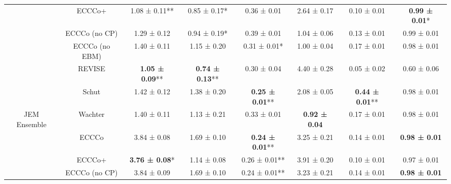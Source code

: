 \begin{table}
{\begin{tabular}[t]{cccccccc}
 & ECCCo+ & 1.08 ± 0.11** & 0.85 ± 0.17*\hphantom{*} & 0.36 ± 0.01\hphantom{*}\hphantom{*} & 2.64 ± 0.17\hphantom{*}\hphantom{*} & 0.10 ± 0.01\hphantom{*}\hphantom{*} & \textbf{0.99 ± 0.01}*\hphantom{*}\\

 & ECCCo (no CP) & 1.29 ± 0.12\hphantom{*}\hphantom{*} & 0.94 ± 0.19*\hphantom{*} & 0.39 ± 0.01\hphantom{*}\hphantom{*} & 1.04 ± 0.06\hphantom{*}\hphantom{*} & 0.13 ± 0.01\hphantom{*}\hphantom{*} & 0.99 ± 0.01\hphantom{*}\hphantom{*}\\

 & ECCCo (no EBM) & 1.40 ± 0.11\hphantom{*}\hphantom{*} & 1.15 ± 0.20\hphantom{*}\hphantom{*} & 0.31 ± 0.01*\hphantom{*} & 1.00 ± 0.04\hphantom{*}\hphantom{*} & 0.17 ± 0.01\hphantom{*}\hphantom{*} & 0.98 ± 0.01\hphantom{*}\hphantom{*}\\

 & REVISE & \textbf{1.05 ± 0.09}** & \textbf{0.74 ± 0.13}** & 0.30 ± 0.04\hphantom{*}\hphantom{*} & 4.40 ± 0.28\hphantom{*}\hphantom{*} & 0.05 ± 0.02\hphantom{*}\hphantom{*} & 0.60 ± 0.06\hphantom{*}\hphantom{*}\\

 & Schut & 1.42 ± 0.12\hphantom{*}\hphantom{*} & 1.38 ± 0.20\hphantom{*}\hphantom{*} & \textbf{0.25 ± 0.01}** & 2.08 ± 0.05\hphantom{*}\hphantom{*} & \textbf{0.44 ± 0.01}** & 0.98 ± 0.01\hphantom{*}\hphantom{*}\\

\multirow[t]{-7}{*}{\centering\arraybackslash JEM Ensemble} & Wachter & 1.40 ± 0.11\hphantom{*}\hphantom{*} & 1.13 ± 0.21\hphantom{*}\hphantom{*} & 0.33 ± 0.01\hphantom{*}\hphantom{*} & \textbf{0.92 ± 0.04}\hphantom{*}\hphantom{*} & 0.17 ± 0.01\hphantom{*}\hphantom{*} & 0.98 ± 0.01\hphantom{*}\hphantom{*}\\
\cmidrule{1-8}
 & ECCCo & 3.84 ± 0.08\hphantom{*}\hphantom{*} & 1.69 ± 0.10\hphantom{*}\hphantom{*} & \textbf{0.24 ± 0.01}** & 3.25 ± 0.21\hphantom{*}\hphantom{*} & 0.14 ± 0.01\hphantom{*}\hphantom{*} & \textbf{0.98 ± 0.01}\hphantom{*}\hphantom{*}\\

 & ECCCo+ & \textbf{3.76 ± 0.08}*\hphantom{*} & 1.14 ± 0.08\hphantom{*}\hphantom{*} & 0.26 ± 0.01** & 3.91 ± 0.20\hphantom{*}\hphantom{*} & 0.10 ± 0.01\hphantom{*}\hphantom{*} & 0.97 ± 0.01\hphantom{*}\hphantom{*}\\

 & ECCCo (no CP) & 3.84 ± 0.09\hphantom{*}\hphantom{*} & 1.69 ± 0.10\hphantom{*}\hphantom{*} & 0.24 ± 0.01** & 3.23 ± 0.21\hphantom{*}\hphantom{*} & 0.14 ± 0.01\hphantom{*}\hphantom{*} & \textbf{0.98 ± 0.01}\hphantom{*}\hphantom{*}\\


\end{tabular}}
\end{table}
